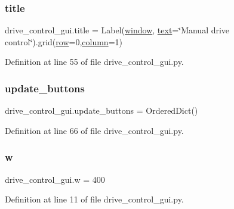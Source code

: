 \subsubsection{\texorpdfstring{title}{title}}
{\footnotesize\ttfamily drive\+\_\+control\+\_\+gui.\+title = Label(\hyperlink{namespacedrive__control__gui_a65b2b897ed3828a7729a3b1ab25b7e88}{window}, \hyperlink{namespacedrive__control__gui_ab00d332aefc4a94abccab0faa842d87b}{text}=\char`\"{}Manual drive control\char`\"{}).grid(\hyperlink{namespacedrive__control__gui_ae1a4d2a2865661c5f27166a881cdc9ae}{row}=0,\hyperlink{namespacedrive__control__gui_ad87e3e1922e47bbecf9f5befa4a8a96d}{column}=1)}



Definition at line 55 of file drive\+\_\+control\+\_\+gui.\+py.

\mbox{\label{namespacedrive__control__gui_ab25155b10730cc1a5e2a7013566a4fe7}} 
\subsubsection{\texorpdfstring{update\+\_\+buttons}{update\_buttons}}
{\footnotesize\ttfamily drive\+\_\+control\+\_\+gui.\+update\+\_\+buttons = Ordered\+Dict()}



Definition at line 66 of file drive\+\_\+control\+\_\+gui.\+py.

\mbox{\label{namespacedrive__control__gui_ae5ecbe532a009a5045df11bcb6032913}} 
\subsubsection{\texorpdfstring{w}{w}}
{\footnotesize\ttfamily drive\+\_\+control\+\_\+gui.\+w = 400}



Definition at line 11 of file drive\+\_\+control\+\_\+gui.\+py.

\mbox{\label{namespacedrive__control__gui_a65b2b897ed3828a7729a3b1ab25b7e88}} 
